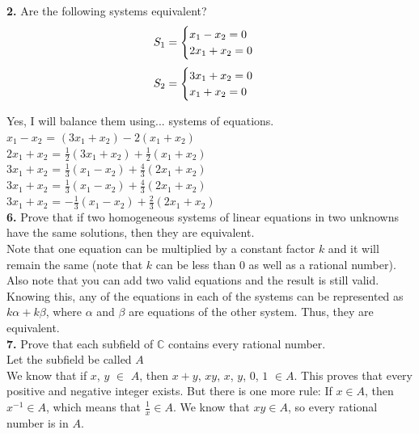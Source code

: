 \documentclass[11pt]{article}
\begin{document}
\textbf{2.}
Are the following systems equivalent?
\begin{equation}
  S_{1} = 
  \begin{cases}
    x_1 - x_2 = 0\\
    2x_1 + x_2 = 0
  \end{cases}\\
\end{equation}
\begin{equation}
  S_{2} = 
  \begin{cases}
    3x_1 + x_2 = 0\\
    x_1 + x_2 = 0
  \end{cases}\\
\end{equation}

Yes, I will balance them using... systems of equations.\\

$x_{1} - x_{2}$ = $(3x_1 + x_2) - 2(x_1 + x_2)$\\
$2x_{1} + x_{2}$ = $\frac{1}{2}(3x_1 + x_2) + \frac{1}{2}(x_1 + x_2)$\\
$3x_{1} + x_{2}$ = $\frac{1}{3}(x_1 - x_2) + \frac{4}{3}(2x_1 + x_2)$\\
$3x_{1} + x_{2}$ = $\frac{1}{3}(x_1 - x_2) + \frac{4}{3}(2x_1 + x_2)$\\
$3x_{1} + x_{2}$ = $-\frac{1}{3}(x_1 - x_2) + \frac{2}{3}(2x_1 + x_2)$\\

\textbf{6.}
Prove that if two homogeneous systems of linear equations in two unknowns have the same solutions, then they are equivalent.\\

Note that one equation can be multiplied by a constant factor $k$ and it will remain the same (note that $k$ can be less than 0 as well as a rational number). Also note that you can add two valid equations and the result is still valid. Knowing this, any of the equations in each of the systems can be represented as $k\alpha + k\beta$, where $\alpha$ and $\beta$ are equations of the other system. Thus, they are equivalent.\\

\textbf{7.}
Prove that each subfield of $\mathbb{C}$ contains every rational number.\\

Let the subfield be called $A$\\

We know that if $x$, $y$ $\in$ $A$, then $x + y$, $xy$, $x$, $y$, $0$, $1$ $\in A$. This proves that every positive and negative integer exists. But there is one more rule: If $x \in A$, then $x^{-1} \in A$, which means that $\frac{1}{x} \in A$. We know that $xy \in A$, so every rational number is in $A$.
\end{document}
